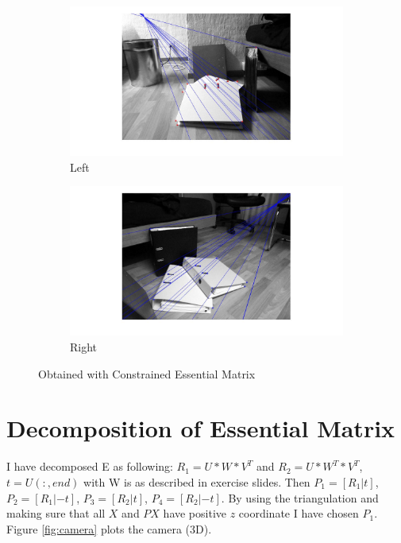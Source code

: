 \documentclass[paper=a4, fontsize=11pt]{scrartcl} %
\numberwithin{equation}{section} %
\numberwithin{figure}{section} %
\numberwithin{table}{section} %
\begin{document}
\begin{figure}
\centering
\begin{subfigure}{.5\textwidth}
  \centering
  \includegraphics[width=1.5\linewidth]{eh1.jpg}
  \caption{Left}
\end{subfigure}%
\begin{subfigure}{.7\textwidth}
  \centering
  \includegraphics[width=1.1\linewidth]{eh2.jpg}
  \caption{Right}
\end{subfigure}
\caption{Obtained with Constrained Essential Matrix}
\label{fig:fh}
\end{figure}

\section{Decomposition of Essential Matrix}
I have decomposed E as following: $R_1 = U * W * V^T$ and $R_2 = U * W^T * V^T$, $t=U(:,end)$ with W is as described in exercise slides. Then $P_1=[R_1|t]$, $P_2=[R_1|-t]$, $P_3=[R_2|t]$, $P_4=[R_2|-t]$. By using the triangulation and making sure that all $X$ and $PX$ have positive $z$ coordinate I have chosen $P_1$. Figure \ref{fig:camera} plots the camera (3D).
\end{document}
